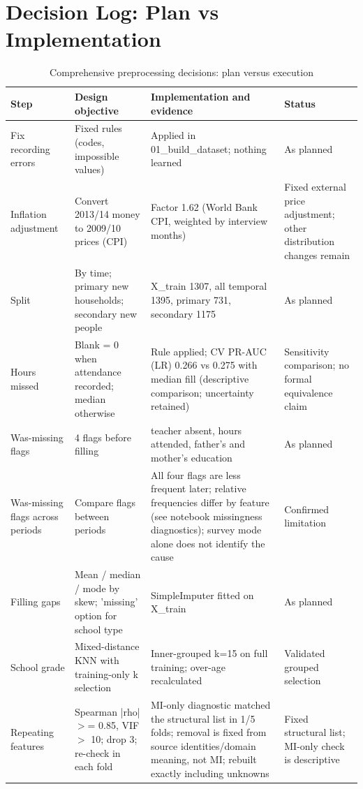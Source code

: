 \documentclass[conference,a4paper]{IEEEtran}
\renewcommand{\arraystretch}{1.12}
\begin{document}
\section{\textbf{Decision Log: Plan vs Implementation}}
\begin{table}[!t]
\centering\footnotesize
\caption{Comprehensive preprocessing decisions: plan versus execution}\label{tab:log}
\setlength{\tabcolsep}{4pt}\renewcommand{\arraystretch}{1.02}
\begin{tabularx}{\textwidth}{P{2.5cm} P{4.0cm} L P{3.0cm}}
\toprule Step & Design objective & Implementation and evidence & Status \\
\midrule
Fix recording errors & Fixed rules (codes, impossible values) & Applied in 01\_build\_dataset; nothing learned & As planned \\
Inflation adjustment & Convert 2013/14 money to 2009/10 prices (CPI) & Factor 1.62 (World Bank CPI, weighted by interview months) & Fixed external price adjustment; other distribution changes remain \\
Split & By time; primary new households; secondary new people & X\_train 1307, all temporal 1395, primary 731, secondary 1175 & As planned \\
Hours missed & Blank = 0 when attendance recorded; median otherwise & Rule applied; CV PR-AUC (LR) 0.266 vs 0.275 with median fill (descriptive comparison; uncertainty retained) & Sensitivity comparison; no formal equivalence claim \\
Was-missing flags & 4 flags before filling & teacher absent, hours attended, father's and mother's education & As planned \\
Was-missing flags across periods & Compare flags between periods & All four flags are less frequent later; relative frequencies differ by feature (see notebook missingness diagnostics); survey mode alone does not identify the cause & Confirmed limitation \\
Filling gaps & Mean / median / mode by skew; 'missing' option for school type & SimpleImputer fitted on X\_train & As planned \\
School grade & Mixed-distance KNN with training-only k selection & Inner-grouped k=15 on full training; over-age recalculated & Validated grouped selection \\
Repeating features & Spearman |rho| $>$= 0.85, VIF $>$ 10; drop 3; re-check in each fold & MI-only diagnostic matched the structural list in 1/5 folds; removal is fixed from source identities/domain meaning, not MI; rebuilt exactly including unknowns & Fixed structural list; MI-only check is descriptive \\

\end{tabularx}
\end{table}
\end{document}
